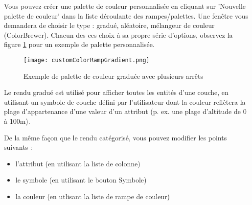 
Vous pouvez créer une palette de couleur personnalisée en cliquant sur 'Nouvelle palette de couleur' dans la liste déroulante des rampes/palettes. Une fenêtre vous demandera de choisir le type : gradué, aléatoire, mélangeur de couleur (ColorBrewer). Chacun des ces choix à sa propre série d'options, observez la figure \ref{fig:ccrg} pour un exemple de palette personnalisée.

\begin{figure}[ht]
   \centering
   \caption{Exemple de palette de couleur graduée avec plusieurs arrêts \nixcaption}\label{fig:ccrg}
   \texttt{[image: customColorRampGradient.png]}
\end{figure}


Le rendu gradué est utilisé pour afficher toutes les entités d'une couche, en utilisant un symbole de couche défini par l'utilisateur dont la couleur reflètera la plage d'appartenance d'une valeur d'un attribut (p. ex. une plage d'altitude de 0 à 100m).

De la même façon que le rendu catégorisé, vous pouvez modifier les points suivants :

\begin{itemize}[label=--]
\item l'attribut (en utilisant la liste de colonne)
\item le symbole (en utilisant le bouton Symbole)
\item la couleur (en utlisant la liste de rampe de couleur)
\end{itemize}

